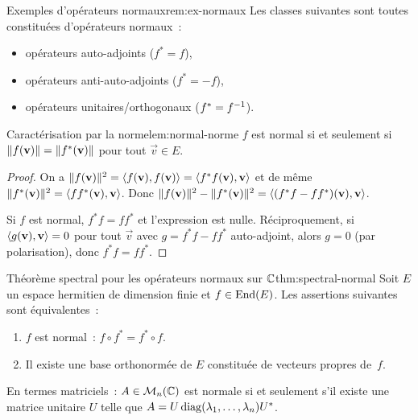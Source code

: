 \begin{remark}{Exemples d'opérateurs normaux}{rem:ex-normaux}
  Les classes suivantes sont toutes constituées d'opérateurs normaux~:
  \begin{itemize}
    \item opérateurs auto-adjoints ($f^* = f$),
    \item opérateurs anti-auto-adjoints ($f^* = -f$),
    \item opérateurs unitaires/orthogonaux ($f^* = {f}^{-1}$).
  \end{itemize}
\end{remark}

\begin{lemma}{Caractérisation par la norme}{lem:normal-norme}
  $f$ est normal si et seulement si
  $\lVert f(\mathbf{v})\rVert = \lVert f^*(\mathbf{v})\rVert$ pour tout $\vec{v} \in E$.
\end{lemma}

\begin{proof}
  On a $\lVert f(\mathbf{v})\rVert^2 = \langle f(\mathbf{v}), f(\mathbf{v})\rangle
  = \langle f^*f(\mathbf{v}), \mathbf{v}\rangle$ et de même
  $\lVert f^*(\mathbf{v})\rVert^2 = \langle ff^*(\mathbf{v}), \mathbf{v}\rangle$.
  Donc $\lVert f(\mathbf{v})\rVert^2 - \lVert f^*(\mathbf{v})\rVert^2
  = \langle(f^*f - ff^*)(\mathbf{v}), \mathbf{v}\rangle$.

  Si $f$ est normal, $f^*f = ff^*$ et l'expression est nulle.
  Réciproquement, si $\langle g(\mathbf{v}), \mathbf{v}\rangle = 0$ pour tout
  $\vec{v}$ avec $g = f^*f - ff^*$ auto-adjoint, alors $g = 0$ (par
  polarisation), donc $f^*f = ff^*$.
\end{proof}

\begin{theorem}{Théorème spectral pour les opérateurs normaux sur ${\mathbb{C}}$}{thm:spectral-normal}
  Soit $E$ un espace hermitien de dimension finie et
  $f \in \operatorname{End}(E)$.
  Les assertions suivantes sont équivalentes~:
  \begin{enumerate}[label=(\roman*)]
    \item $f$ est normal~: $f \circ f^* = f^* \circ f$.
    \item Il existe une base orthonormée de $E$ constituée de vecteurs
      propres de~$f$.
  \end{enumerate}
  En termes matriciels~: $A \in \mathcal{M}_n({\mathbb{C}})$ est normale si et seulement
  s'il existe une matrice unitaire $U$ telle que
  $A = U \operatorname{diag}(\lambda_1, \ldots, \lambda_n) {U}^{*}$.
\end{theorem}


